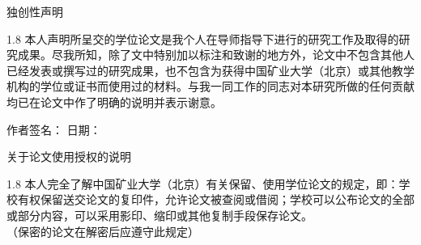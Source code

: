 \pagestyle{empty}

\vspace*{0.5cm} 

\begin{center}
    { \heiti 独创性声明} 
\end{center}

\vspace{1cm}

\begin{spacing}{1.8}
    { \songti 本人声明所呈交的学位论文是我个人在导师指导下进行的研究工作及取得的研究成果。尽我所知，除了文中特别加以标注和致谢的地方外，论文中不包含其他人已经发表或撰写过的研究成果，也不包含为获得中国矿业大学（北京）或其他教学机构的学位或证书而使用过的材料。与我一同工作的同志对本研究所做的任何贡献均已在论文中作了明确的说明并表示谢意。}
\end{spacing}

\vspace{0.8cm}

\begin{flushright}
    { \songti 作者签名：\underline{\hspace{4cm}} \quad 日期：\underline{\hspace{3cm}}}
\end{flushright}

\vspace{3.5cm}

\begin{center}
    { \heiti 关于论文使用授权的说明}
\end{center}

\vspace{1cm}

\begin{spacing}{1.8}
    { \songti 本人完全了解中国矿业大学（北京）有关保留、使用学位论文的规定，即：学校有权保留送交论文的复印件，允许论文被查阅或借阅；学校可以公布论文的全部或部分内容，可以采用影印、缩印或其他复制手段保存论文。\\
    （保密的论文在解密后应遵守此规定）}
\end{spacing}

\vspace{1.5cm}


\clearpage
